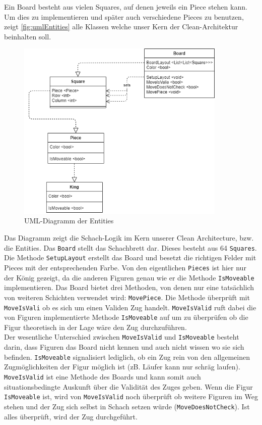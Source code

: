 \documentclass[
10pt, %
a4paper, %
oneside, %
headinclude,footinclude, %
BCOR5mm, %
]{scrartcl}
\begin{document}
Ein Board besteht aus vielen Squares, auf denen jeweils ein Piece stehen kann. Um dies zu implementieren und später auch verschiedene Pieces zu benutzen, zeigt \autoref{fig:umlEntities} alle Klassen welche unser Kern der Clean-Architektur beinhalten soll. 
\begin{figure}[h]
	\begin{center}
		\includegraphics[width=10cm]{entities.png}
		\caption{\label{pic:umlEntities} UML-Diagramm der Entities}
	\end{center}
\end{figure}
Das Diagramm zeigt die Schach-Logik im Kern unserer Clean Architecture, bzw. die Entities. Das \texttt{Board} stellt das Schachbrett dar. Dieses besteht aus 64 \texttt{Squares}. Die Methode \texttt{SetupLayout} erstellt das Board und besetzt die richtigen Felder mit Pieces mit der entsprechenden Farbe.
Von den eigentlichen \texttt{Pieces} ist hier nur der König gezeigt, da die anderen Figuren genau wie er die Methode \texttt{IsMoveable} implementieren. 
Das Board bietet drei Methoden, von denen nur eine tatsächlich von weiteren Schichten verwendet wird: \texttt{MovePiece}. Die Methode überprüft mit \texttt{MoveIsVali} ob es sich um einen Validen Zug handelt. \texttt{MoveIsValid} ruft dabei die von Figuren implementierte Methode \texttt{IsMoveable} auf um zu überprüfen ob die Figur theoretisch in der Lage wäre den Zug durchzuführen.\\ Der wesentliche Unterschied zwischen \texttt{MoveIsValid} und \texttt{IsMoveable} besteht darin, dass Figuren das Board nicht kennen und auch nicht wissen wo sie sich befinden. \texttt{IsMoveable} signalisiert lediglich, ob ein Zug rein von den allgemeinen Zugmöglichkeiten der Figur möglich ist (zB. Läufer kann nur schräg laufen). \texttt{MoveIsValid} ist eine Methode des Boards und kann somit auch situationsbedingte Auskunft über die Validität des Zuges geben. Wenn die Figur \texttt{IsMoveable} ist, wird von \texttt{MoveIsValid} noch überprüft ob weitere Figuren im Weg stehen und der Zug sich selbst in Schach setzen würde (\texttt{MoveDoesNotCheck}). Ist alles überprüft, wird der Zug durchgeführt.
\end{document}
